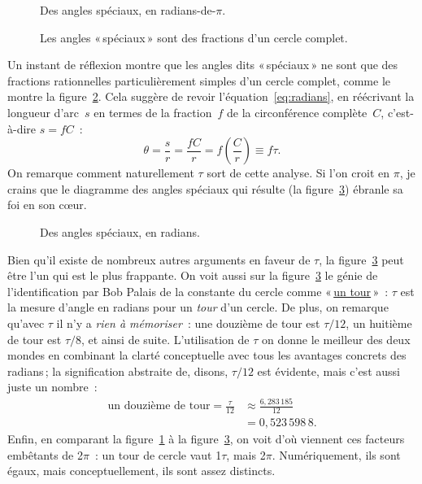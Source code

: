 \begin{figure}
\begin{center}
\end{center}
\caption{Des angles spéciaux, en radians-de-$\pi$.\label{fig:pi_angles}}
\end{figure}

\begin{figure}
\begin{center}
\end{center}
\caption{Les angles «\,spéciaux\,» sont des fractions d'un cercle complet.\label{fig:angle_fractions}}
\end{figure}

Un instant de réflexion montre que les angles dits «\,spéciaux\,» ne sont que des fractions rationnelles particulièrement simples d'un cercle complet, comme le montre la figure~\ref{fig:angle_fractions}. Cela suggère de revoir l'équation~\eqref{eq:radians}, en réécrivant la longueur d'arc~$s$ en termes de la fraction~$f$ de la circonférence complète~$C$, c'est-à-dire $s = f C$~:
\[ \theta = \frac{s}{r} = \frac{fC}{r} =  f\left(\frac{C}{r}\right) \equiv f\tau. \]
On remarque comment naturellement $\tau$ sort de cette analyse. Si l'on croit en $\pi$, je crains que le diagramme des angles spéciaux qui résulte (la figure~\ref{fig:tau_angles}) ébranle sa foi en son cœur.

\begin{figure}
\begin{center}
\end{center}
\caption{Des angles spéciaux, en radians.\label{fig:tau_angles}}
\end{figure}

Bien qu'il existe de nombreux autres arguments en faveur de $\tau$, la figure~\ref{fig:tau_angles} peut être l'un qui est le plus frappante. On voit aussi sur la figure~\ref{fig:tau_angles} le génie de l'identification par Bob Palais de la constante du cercle comme «\,\href{https://fr.wikipedia.org/wiki/Tour_(angle)}{un tour}\,»~: $\tau$ est la mesure d'angle en radians pour un \emph{tour} d'un cercle. De plus, on remarque qu'avec $\tau$ il n'y a \emph{rien à mémoriser}~: une douzième de tour est $\tau/12$, un huitième de tour est $\tau/8$, et ainsi de suite. L'utilisation de $\tau$ on donne le meilleur des deux mondes en combinant la clarté conceptuelle avec tous les avantages concrets des radians\,; la signification abstraite de, disons, $\tau/12$ est évidente, mais c'est aussi juste un nombre~:
\[
\begin{split}
\mbox{un douzième de tour} = \frac{\tau}{12} & \approx \frac{6{,}283\,185}{12} \\
                                             & = 0{,}523\,598\,8.
\end{split}
\]
Enfin, en comparant la figure~\ref{fig:pi_angles} à la figure~\ref{fig:tau_angles}, on voit d'où viennent ces facteurs embêtants de 2$\pi$~: un tour de cercle vaut 1$\tau$, mais 2$\pi$. Numériquement, ils sont égaux, mais conceptuellement, ils sont assez distincts.

